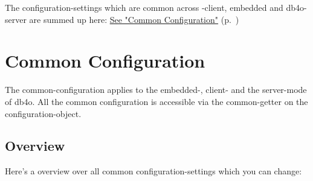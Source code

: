 The configuration-settings which are common across -client, embedded and db4o-server are summed up here: \hyperref[ref:configuration-common-configuration]{See "Common Configuration"} (p.~\pageref{ref:configuration-common-configuration})

\section{Common Configuration}
\label{ref:configuration-common-configuration}

The common-configuration applies to the embedded-, client- and the server-mode of db4o. All the common configuration is accessible via the common-getter on the configuration-object.

\subsection*{Overview}

Here's a overview over all common configuration-settings which you can change:

